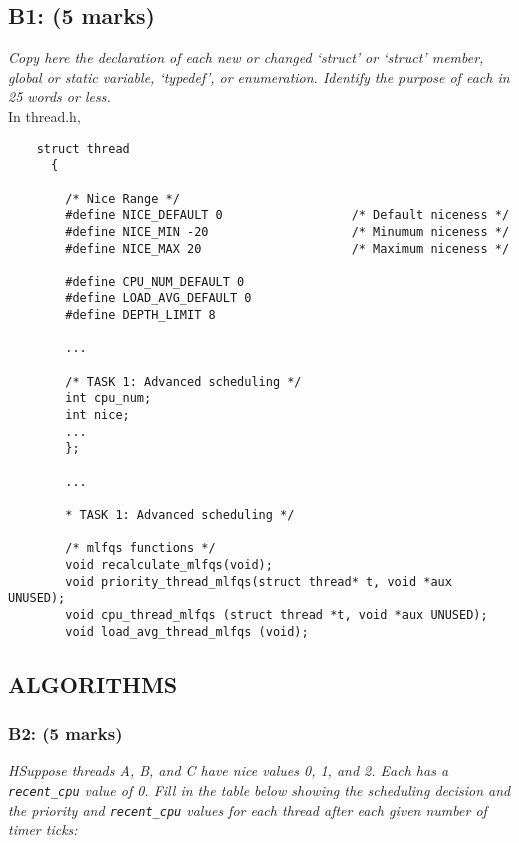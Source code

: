 \documentclass{article}
\begin{document}
\subsection*{B1: (5 marks) }

\textit{Copy here the declaration of each new or changed ‘struct’ or ‘struct’ member, global or static variable, ‘typedef’, or enumeration. Identify the purpose of each in 25 words or less.}
\\

In thread.h,
\begin{lstlisting}
    struct thread
      {

        /* Nice Range */
        #define NICE_DEFAULT 0                  /* Default niceness */
        #define NICE_MIN -20                    /* Minumum niceness */
        #define NICE_MAX 20                     /* Maximum niceness */

        #define CPU_NUM_DEFAULT 0
        #define LOAD_AVG_DEFAULT 0
        #define DEPTH_LIMIT 8

        ...

        /* TASK 1: Advanced scheduling */
        int cpu_num;
        int nice;
        ...
        };

        ...

        * TASK 1: Advanced scheduling */

        /* mlfqs functions */
        void recalculate_mlfqs(void);
        void priority_thread_mlfqs(struct thread* t, void *aux UNUSED);
        void cpu_thread_mlfqs (struct thread *t, void *aux UNUSED);
        void load_avg_thread_mlfqs (void);

\end{lstlisting}


\subsection{ALGORITHMS}

\subsubsection*{B2: (5 marks) }
\textit{HSuppose threads A, B, and C have nice values 0, 1, and 2.  Each has a \texttt{recent\_cpu} value of 0.  Fill in the table below showing the scheduling decision and the priority and \texttt{recent\_cpu} values for each thread after each given number of timer ticks:}
\end{document}

